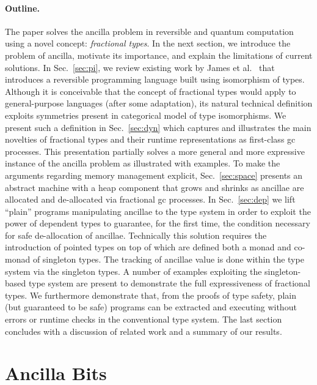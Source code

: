 \documentclass[sigplan,10pt,review,anonymous]{acmart}
\begin{document}
\paragraph*{Outline.} The paper solves the ancilla problem in
reversible and quantum computation using a novel concept:
\emph{fractional types}. In the next section, we introduce the problem
of ancilla, motivate its importance, and explain the limitations of
current solutions. In Sec.~\ref{sec:pi}, we review existing work by
James et al.~\cite{rc2011,rc2012,James:2012:IE:2103656.2103667} that
introduces a reversible programming language built using isomorphism
of types. Although it is conceivable that the concept of fractional
types would apply to general-purpose languages (after some
adaptation), its natural technical definition exploits symmetries
present in categorical model of type isomorphisms. We present such a
definition in Sec.~\ref{sec:dyn} which captures and illustrates the
main novelties of fractional types and their runtime representations
as first-class gc processes. This presentation partially solves a more
general and more expressive instance of the ancilla problem as
illustrated with examples. To make the arguments regarding memory
management explicit, Sec.~\ref{sec:space} presents an abstract machine
with a heap component that grows and shrinks as ancillae are allocated
and de-allocated via fractional gc processes. In Sec.~\ref{sec:dep} we
lift ``plain'' programs manipulating ancillae to the type system in
order to exploit the power of dependent types to guarantee, for the
first time, the condition necessary for safe de-allocation of
ancillae. Technically this solution requires the introduction of
pointed types on top of which are defined both a monad and co-monad of
singleton types. The tracking of ancillae value is done within the
type system via the singleton types. A number of examples exploiting
the singleton-based type system are present to demonstrate the full
expressiveness of fractional types. We furthermore demonstrate that,
from the proofs of type safety, plain (but guaranteed to be safe)
programs can be extracted and executing without errors or runtime
checks in the conventional type system. The last section concludes
with a discussion of related work and a summary of our results.

\section{Ancilla Bits}
\label{sec:examples}
 
\end{document}

